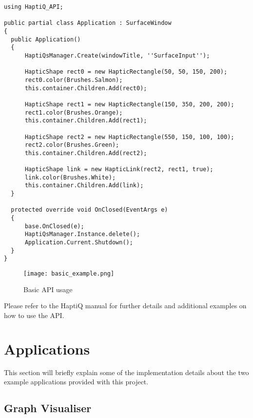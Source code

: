 \lstset{style=sharpc}
\begin{lstlisting}[caption={Basic API usage},label={lst:basicAPIUsage}]
using HaptiQ_API;

public partial class Application : SurfaceWindow
{
  public Application()
  {
      HaptiQsManager.Create(windowTitle, ''SurfaceInput'');
      
      HapticShape rect0 = new HapticRectangle(50, 50, 150, 200);
      rect0.color(Brushes.Salmon);
      this.container.Children.Add(rect0);
      
      HapticShape rect1 = new HapticRectangle(150, 350, 200, 200);
      rect1.color(Brushes.Orange);
      this.container.Children.Add(rect1);
      
      HapticShape rect2 = new HapticRectangle(550, 150, 100, 100);
      rect2.color(Brushes.Green);
      this.container.Children.Add(rect2);
      
      HapticShape link = new HapticLink(rect2, rect1, true);
      link.color(Brushes.White);
      this.container.Children.Add(link);
  }
  
  protected override void OnClosed(EventArgs e)
  {
      base.OnClosed(e);
      HaptiQsManager.Instance.delete();
      Application.Current.Shutdown();
  }
}
\end{lstlisting}

\begin{figure}[H]
  \centering
  \texttt{[image: basic\_example.png]}
  \caption{Basic API usage}
  \label{fig:basicexample}
\end{figure}

Please refer to the HaptiQ manual for further details and additional examples on how to use the API. 


\section{Applications}
\label{sec:Applications}

This section will briefly explain some of the implementation details about the two example applications provided with this project. 

\subsection{Graph Visualiser}

